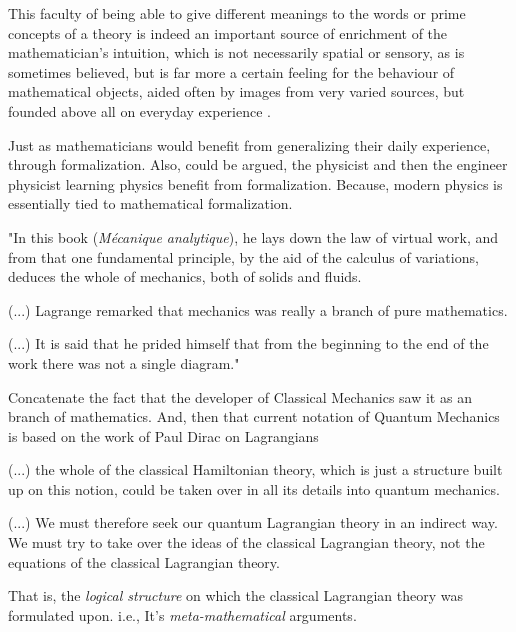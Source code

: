 \documentclass[
12pt,				%
openright,			%
oneside,			%
a4paper,			%
brazil,				%
english,			  %
]{abntex2}
\begin{document}
\begin{citacao}
 This faculty of being able to give
 different meanings to the words or prime concepts of a theory is indeed an
 important source of enrichment of the mathematician's intuition, which is
 not necessarily spatial or sensory, as is sometimes believed, but is far more
 a certain feeling for the behaviour of mathematical objects, aided often
 by images from very varied sources, but founded above all on everyday
 experience \cite{bourbaki2004theory}.
\end{citacao}

Just as mathematicians would benefit from generalizing their daily
experience, through formalization. Also, could be argued, the
physicist and then the engineer physicist learning physics benefit
from formalization. Because, modern physics is essentially tied to
mathematical formalization.

\begin{citacao}
"In this book (\textit{Mécanique analytique}), he lays down the law of
virtual work, and from that one fundamental principle, by the aid of
the calculus of variations, deduces the whole of mechanics, both of solids and fluids.

(...) Lagrange remarked that mechanics was really a branch of pure mathematics.

(...) It is said that he prided himself that from the beginning to the
end of the work there was not a single diagram." \cite{panza2003origins}
\end{citacao}

Concatenate the fact that the developer of Classical Mechanics saw it
as an branch of mathematics. And, then that current notation of
Quantum Mechanics is based on the work of Paul Dirac on Lagrangians\cite{dirac2005lagrangian}

\begin{citacao}
(...) the whole of the classical Hamiltonian theory, which is just a structure built up on this notion, could be taken over in all its details into quantum mechanics.
  
(...) We must therefore seek our quantum Lagrangian theory in an
indirect way. We must try to take over the ideas of the classical
Lagrangian theory, not the equations of the classical Lagrangian
theory. \cite{dirac2005lagrangian}
\end{citacao}

That is, the \textit{logical structure} on which the classical
Lagrangian theory was formulated upon. i.e., It's \textit{meta-mathematical} arguments.
\end{document}
